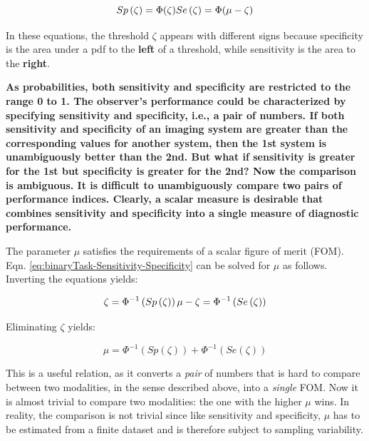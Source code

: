 \documentclass[
]{book}
\begin{document}
\begin{equation} 
Sp\left ( \zeta \right ) = \Phi(\zeta)\\
Se\left ( \zeta \right ) = \Phi(\mu-\zeta)
\label{eq:binaryTask-Sensitivity-Specificity}
\end{equation}

In these equations, the threshold \(\zeta\) appears with different signs because specificity is the area under a pdf to the \textbf{left} of a threshold, while sensitivity is the area to the \textbf{right}.

\textbf{As probabilities, both sensitivity and specificity are restricted to the range 0 to 1. The observer's performance could be characterized by specifying sensitivity and specificity, i.e., a pair of numbers. If both sensitivity and specificity of an imaging system are greater than the corresponding values for another system, then the 1st system is unambiguously better than the 2nd. But what if sensitivity is greater for the 1st but specificity is greater for the 2nd? Now the comparison is ambiguous. It is difficult to unambiguously compare two pairs of performance indices. Clearly, a scalar measure is desirable that combines sensitivity and specificity into a single measure of diagnostic performance.}

The parameter \(\mu\) satisfies the requirements of a scalar figure of merit (FOM). Eqn. \eqref{eq:binaryTask-Sensitivity-Specificity} can be solved for \(\mu\) as follows. Inverting the equations yields:

\begin{equation} 
\zeta =\Phi^{-1} \left (Sp\left ( \zeta \right )  \right )\\
\mu - \zeta = \Phi^{-1} \left (Se\left ( \zeta \right )  \right )
\label{eq:binaryTask-SolveForMuZeta}
\end{equation}

Eliminating \(\zeta\) yields:

\begin{equation} 
\mu = \Phi^{-1} \left (Sp\left ( \zeta \right )  \right ) + \Phi^{-1} \left (Se\left ( \zeta \right )  \right )
\label{eq:binaryTask-SolveForMu}
\end{equation}

This is a useful relation, as it converts a \emph{pair} of numbers that is hard to compare between two modalities, in the sense described above, into a \emph{single} FOM. Now it is almost trivial to compare two modalities: the one with the higher \(\mu\) wins. In reality, the comparison is not trivial since like sensitivity and specificity, \(\mu\) has to be estimated from a finite dataset and is therefore subject to sampling variability.
\end{document}
